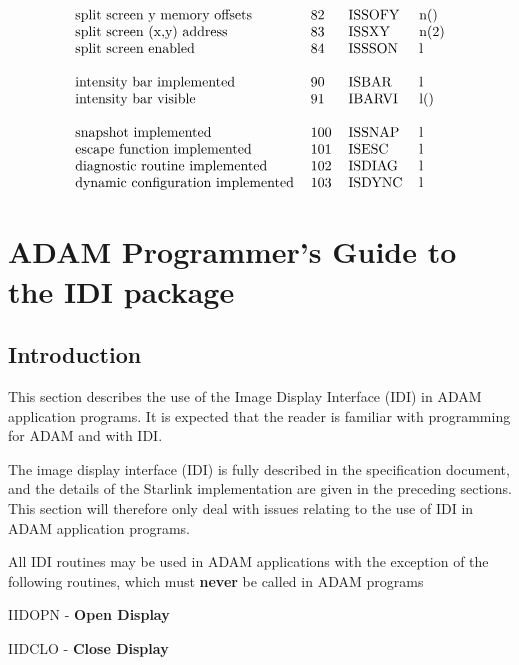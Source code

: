\[\begin{tabular}{llll}
split screen y memory offsets & 82 & ISSOFY & n() \\
split screen (x,y) address & 83 & ISSXY & n(2) \\
split screen enabled & 84 & ISSSON & l \\
\\
intensity bar implemented & 90 & ISBAR & l \\
intensity bar visible & 91 & IBARVI & l() \\
\\
snapshot implemented & 100 & ISSNAP & l \\
escape function implemented & 101 & ISESC & l \\
diagnostic routine implemented & 102 & ISDIAG & l \\
dynamic configuration implemented & 103 & ISDYNC & l \\
\end{tabular}\]

\newpage
\section{ADAM Programmer's Guide to the IDI package}
\label{se:apg}

\subsection{Introduction}

This section describes the use of the Image Display Interface (IDI) in
ADAM application programs. It is expected that the reader is familiar with
programming for ADAM and with IDI.

The image display interface (IDI) is fully described in the specification
document, and the details of the Starlink implementation are given in
the preceding sections. This section will therefore only deal with issues
relating to the use of IDI in ADAM application programs.

All IDI routines may be used in ADAM applications with the exception of
the following routines, which must {\bf never} be called in ADAM programs

\hspace*{20mm}\begin{minipage}{140mm}

\noindent
IIDOPN - {\bf Open Display}

\noindent
IIDCLO - {\bf Close Display}

\end{minipage}

